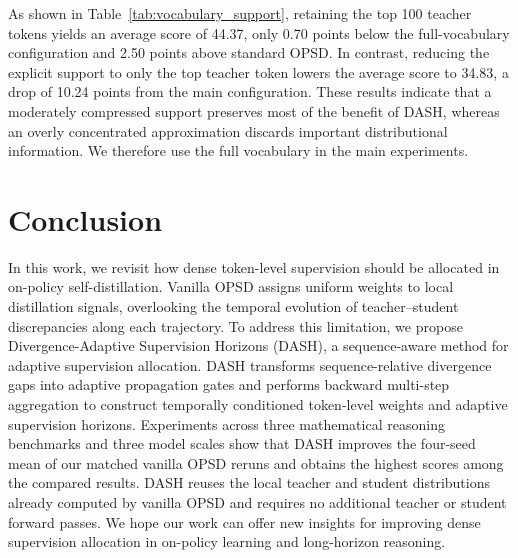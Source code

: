 \documentclass[letterpaper]{article} %
\begin{document}
As shown in Table~\ref{tab:vocabulary_support}, retaining the top 100
teacher tokens yields an average score of 44.37, only 0.70 points below
the full-vocabulary configuration and 2.50 points above standard OPSD.
In contrast, reducing the explicit support to only the top teacher
token lowers the average score to 34.83, a drop of 10.24 points from
the main configuration. These results indicate that a moderately
compressed support preserves most of the benefit of DASH, whereas an
overly concentrated approximation discards important distributional
information. We therefore use the full vocabulary in the main
experiments.



\section{Conclusion}

In this work, we revisit how dense token-level supervision should be allocated in on-policy self-distillation. Vanilla OPSD assigns uniform weights to local distillation signals, overlooking the temporal evolution of teacher--student discrepancies along each trajectory. To address this limitation, we propose Divergence-Adaptive Supervision Horizons (DASH), a sequence-aware method for adaptive supervision allocation. DASH transforms sequence-relative divergence gaps into adaptive propagation gates and performs backward multi-step aggregation to construct temporally conditioned token-level weights and adaptive supervision horizons. Experiments across three mathematical reasoning benchmarks and three model scales show that DASH improves the four-seed mean of our matched vanilla OPSD reruns and obtains the highest scores among the compared results. DASH reuses the local teacher and student distributions already computed by vanilla OPSD and requires no additional teacher or student forward passes. We hope our work can offer new insights for improving dense supervision allocation in on-policy learning and long-horizon reasoning.
\end{document}
